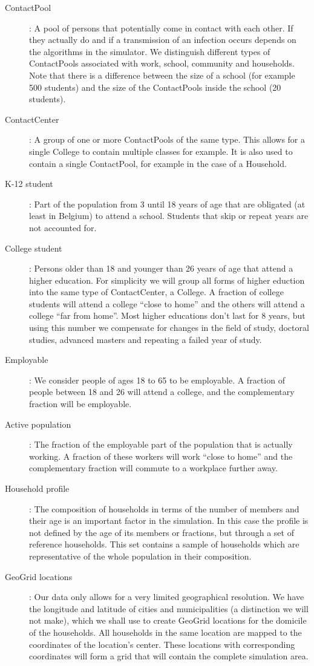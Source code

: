 \begin{description}
    \item[ContactPool]:
        A pool of persons that potentially come in contact with each other.
        If they actually do and if a transmission of an infection occurs depends on the algorithms in the simulator.
        We distinguish different types of ContactPools associated with work, school, community and households.
        Note that there is a difference between the size of a school (for example 500 students) and the size of the ContactPools inside the school (20 students).
    \item[ContactCenter]:
        A group of one or more ContactPools of the same type.
        This allows for a single College to contain multiple classes for example.
        It is also used to contain a single ContactPool, for example in the case of a Household.
    \item[K-12 student]: Part of the population from 3 until 18 years of age that are obligated (at least in Belgium) to attend a school. Students that skip or repeat years are not accounted for.
    \item[College student]:
        Persons older than 18 and younger than 26 years of age that attend a higher education. For simplicity we will group all forms of higher eduction into the same type of ContactCenter, a College. A fraction of college students will attend a college ``close to home'' and the others will attend a college ``far from home''.
        Most higher educations don't last for 8 years, but using this number we compensate for changes in the field of study, doctoral studies, advanced masters and repeating a failed year of study.
    \item[Employable]:
        We consider people of ages 18 to 65 to be employable. A fraction of people between 18 and 26 will attend a college, and the complementary fraction will be employable.
    \item[Active population]:
        The fraction of the employable part of the population that is actually working. A fraction of these workers will work ``close to home'' and the complementary fraction will commute to a workplace further away.
    \item[Household profile]:
        The composition of households in terms of the number of members and their age is an important factor in the simulation. In this case the profile is not defined by the age of its members or fractions, but through a set of reference households. This set contains a sample of households which are representative of the whole population in their composition.
    \item[GeoGrid locations]:
        Our data only allows for a very limited geographical resolution. We have the longitude and latitude of cities and municipalities (a distinction we will not make), which we shall use to create GeoGrid locations for the domicile of the households.
        All households in the same location are mapped to the coordinates of the location's center. These locations with corresponding coordinates will form a grid that will contain the complete simulation area.
\end{description}

